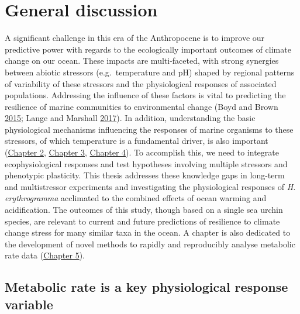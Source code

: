 \documentclass[a4paper,10pt, oneside]{memoir}
\begin{document}
\hypertarget{gendiscussion}{%
\chapter{General discussion}\label{gendiscussion}}

A significant challenge in this era of the Anthropocene is to improve our predictive power with regards to the ecologically important outcomes of climate change on our ocean.
These impacts are multi-faceted, with strong synergies between abiotic stressors (e.g.~temperature and pH) shaped by regional patterns of variability of these stressors and the physiological responses of associated populations.
Addressing the influence of these factors is vital to predicting the resilience of marine communities to environmental change (Boyd and Brown \protect\hyperlink{ref-Boyd2015}{2015}; Lange and Marshall \protect\hyperlink{ref-Lange2017}{2017}).
In addition, understanding the basic physiological mechanisms influencing the responses of marine organisms to these stressors, of which temperature is a fundamental driver, is also important (\protect\hyperlink{warming}{Chapter 2}, \protect\hyperlink{multistressor}{Chapter 3}, \protect\hyperlink{transgen}{Chapter 4}).
To accomplish this, we need to integrate ecophysiological responses and test hypotheses involving multiple stressors and phenotypic plasticity.
This thesis addresses these knowledge gaps in long-term and multistressor experiments and investigating the physiological responses of \emph{H. erythrogramma} acclimated to the combined effects of ocean warming and acidification.
The outcomes of this study, though based on a single sea urchin species, are relevant to current and future predictions of resilience to climate change stress for many similar taxa in the ocean.
A chapter is also dedicated to the development of novel methods to rapidly and reproducibly analyse metabolic rate data (\protect\hyperlink{package}{Chapter 5}).

\hypertarget{metabolic-rate-is-a-key-physiological-response-variable}{%
\section{Metabolic rate is a key physiological response variable}\label{metabolic-rate-is-a-key-physiological-response-variable}}
\end{document}
